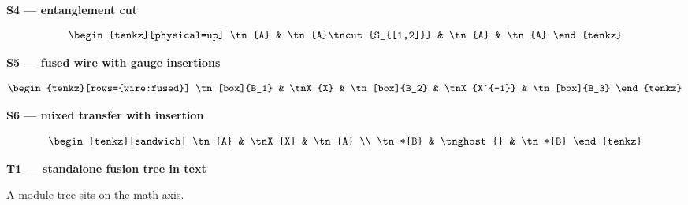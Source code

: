 \documentclass[varwidth=19cm, border=8pt]{standalone}
\newcommand{\head}[1]{\par\medskip\noindent\textbf{#1}\par\smallskip}
\begin{document}
\head{S4 — entanglement cut}
\[
  \begin{tenkz}[physical=up]
    \tn{A} & \tn{A}\tncut{S_{[1,2]}} & \tn{A} & \tn{A}
  \end{tenkz}
\]

\head{S5 — fused wire with gauge insertions}
\[
  \begin{tenkz}[rows={wire:fused}]
    \tn[box]{B_1} & \tnX{X} & \tn[box]{B_2} & \tnX{X^{-1}} & \tn[box]{B_3}
  \end{tenkz}
\]

\head{S6 — mixed transfer with insertion}
\[
  \begin{tenkz}[sandwich]
    \tn{A} & \tnX{X} & \tn{A} \\
    \tn*{B} & \tnghost{} & \tn*{B}
  \end{tenkz}
\]

\head{T1 — standalone fusion tree in text}
A module tree  sits on the math axis.
\end{document}
